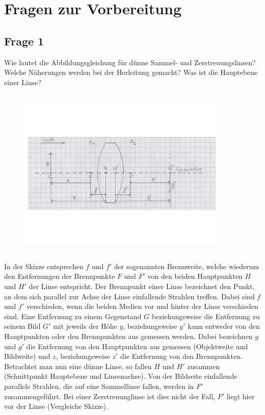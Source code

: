 \documentclass[a4paper,10pt]{scrartcl}
\begin{document}
		\newpage
		
	\section{Fragen zur Vorbereitung}
		\subsection{Frage 1}
			Wie lautet die Abbildungsgleichung für dünne Sammel- und Zerstreuungslinsen? Welche Näherungen
			werden bei der Herleitung gemacht? Was ist die Hauptebene einer Linse?\\
			\\
			\begin{figure}[h]
\centering
\includegraphics[width=0.9\textwidth]{./Bilder/og8}
\end{figure}
\FloatBarrier
			\\
			In der Skizze entsprechen \(f\) und \(f'\) der sogenannten Brennweite, welche wiederum den Entfernungen der Brennpunkte \(F\) und \(F'\) von den beiden Hauptpunkten \(H\) und \(H'\) der Linse entspricht. Der Brennpunkt einer Linse bezeichnet den Punkt, an dem sich parallel zur Achse der Linse einfallende Strahlen treffen. Dabei sind \(f\) und \(f'\) verschieden, wenn die beiden Medien vor und hinter der Linse verschieden sind. Eine Entfernung zu einem Gegenstand \(G\) beziehungsweise die Entfernung zu seinem Bild \(G'\) mit jeweils der Höhe \(y\), beziehungsweise \(y'\) kann entweder von den Hauptpunkten oder den Brennpunkten aus gemessen werden. Dabei bezeichnen \(g\) und \(g'\) die Entfernung von den Hauptpunkten aus gemessen (Objektweite und Bildweite) und \(z\), beziehungsweise \(z'\) die Entfernung von den Brennpunkten. Betrachtet man nun eine dünne Linse, so fallen \(H\) und \(H'\) zusammen (Schnittpunkt Hauptebene und Linsenachse). Von der Bildseite einfallende parallele Strahlen, die auf eine Sammellinse fallen, werden in \(F'\) zusammengeführt. Bei einer Zerstreuunglinse ist dies nicht der Fall, \(F'\) liegt hier vor der Linse (Vergleiche Skizze).\\
\end{document}
